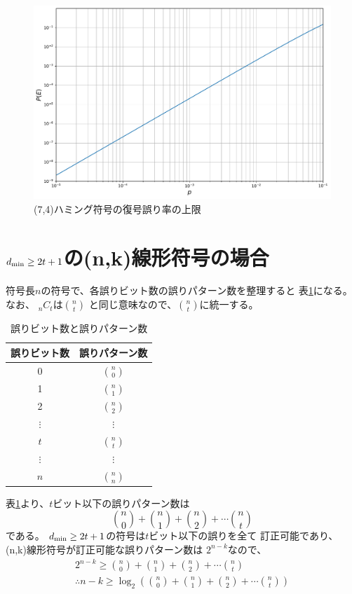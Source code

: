 \documentclass[a4paper,11pt]{jsarticle}
\begin{document}
\begin{figure}[htbp]
  \begin{center}
  \includegraphics[scale=0.5]{figures/test.pdf}
  \end{center}
  \caption{(7,4)ハミング符号の復号誤り率の上限
  \label{fig:error-max}
  }
\end{figure}

\section{$d_{\rm min} \geq 2t+1$の(n,k)線形符号の場合}
符号長$n$の符号で、各誤りビット数の誤りパターン数を整理すると
表\ref{table:error-bits-num}になる。なお、
${}_nC_t$は$\binom{n}{t}$
と同じ意味なので、$\binom{n}{t}$に統一する。
\begin{table}[hbtp]
  \caption{誤りビット数と誤りパターン数}
  \label{table:error-bits-num}
  \centering
  \begin{tabular}{|cc|}
    \hline
    誤りビット数 & 誤りパターン数 \\ \hline \hline
    0 & $\binom{n}{0}$ \\ \hline
    1 & $\binom{n}{1}$ \\ \hline 
    2 & $\binom{n}{2}$ \\ \hline 
    $\vdots$ & $\vdots$ \\ \hline
    $t$ & $\binom{n}{t}$ \\ \hline
    $\vdots$ & $\vdots$ \\ \hline
    $n$ & $\binom{n}{n}$ \\ \hline
  \end{tabular}
\end{table}
表\ref{table:error-bits-num}より、$t$ビット以下の誤りパターン数は
\[
  \binom{n}{0}+\binom{n}{1}+\binom{n}{2}+\cdots \binom{n}{t}
\]
である。
$d_{\rm min} \geq 2t+1$の符号は$t$ビット以下の誤りを全て
訂正可能であり、(n,k)線形符号が訂正可能な誤りパターン数は
$2^{n-k}$なので、
\begin{eqnarray*}
  2^{n-k} \geq \binom{n}{0}+\binom{n}{1}+\binom{n}{2}+\cdots \binom{n}{t} \\
  \therefore n-k \geq \log_2\left(\binom{n}{0}+\binom{n}{1}+\binom{n}{2}+\cdots \binom{n}{t}\right)
\end{eqnarray*}
\end{document}

